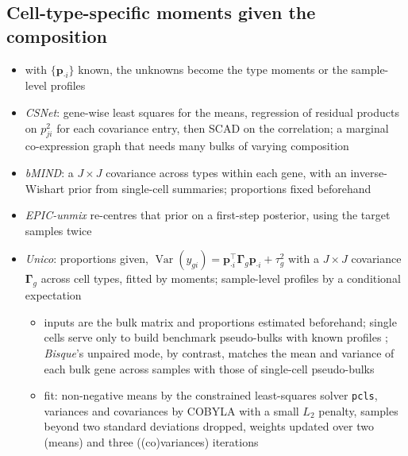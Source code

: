 \subsection{Cell-type-specific moments given the composition}
\label{app:cts}

\begin{itemize}
  \item with \(\{\boldsymbol{p}_{\cdot i}\}\) known, the unknowns become the type moments or the sample-level profiles
  \item \emph{CSNet}: gene-wise least squares for the means, regression of residual products on \(p_{ji}^{2}\) for
        each covariance entry, then SCAD on the correlation; a marginal co-expression graph that needs many bulks
        of varying composition \cite{suEstimatingCellTypeSpecificGene2024}
  \item \emph{bMIND}: a \(J\times J\) covariance across types within each gene, with an inverse-Wishart prior from
        single-cell summaries; proportions fixed beforehand \cite{wangBayesianEstimationCelltypespecific2020}
  \item \emph{EPIC-unmix} re-centres that prior on a first-step posterior, using the target samples twice
        \cite{tangCellTypespecificInference2025}
  \item \emph{Unico}: proportions given, \(\operatorname{Var}(y_{gi})=\boldsymbol{p}_{\cdot i}^{\top}\boldsymbol{\Gamma}_{g}\boldsymbol{p}_{\cdot i}+\tau_{g}^{2}\) with a
        \(J\times J\) covariance \(\boldsymbol{\Gamma}_{g}\) across cell types, fitted by moments; sample-level profiles by a
        conditional expectation \cite{chenUnicoUnifiedModelCell2025}
  \begin{itemize}
    \item inputs are the bulk matrix and proportions estimated beforehand; single cells serve only to build benchmark
          pseudo-bulks with known profiles \cite[pp.~11 and~17]{chenUnicoUnifiedModelCell2025}; \emph{Bisque}'s unpaired
          mode, by contrast, matches the mean and variance of each bulk gene across samples with those of single-cell
          pseudo-bulks \cite[p.~10]{jewAccurateEstimationCell2020}
    \item fit: non-negative means by the constrained least-squares solver \texttt{pcls}, variances and covariances by
          COBYLA with a small \(L_{2}\) penalty, samples beyond two standard deviations dropped, weights updated over two
          (means) and three ((co)variances) iterations \cite[p.~14]{chenUnicoUnifiedModelCell2025}

\end{itemize}
\end{itemize}
